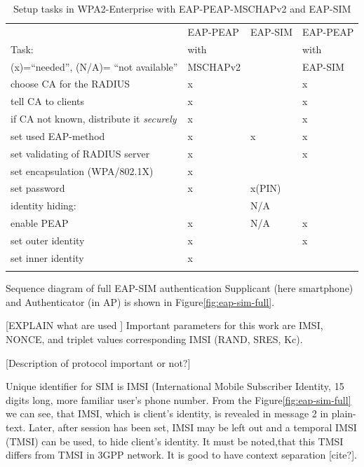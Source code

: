 \documentclass[12pt,a4paper,english]{tutthesis}
\begin{document}
\begin{otherlanguage}{english}
\begin{table}[htb]
\caption{\label{table-peapsim}Setup tasks in  WPA2-Enterprise with EAP-PEAP-MSCHAPv2 and EAP-SIM}
\centering
\begin{tabular}{llll}
 & EAP-PEAP & EAP-SIM & EAP-PEAP\\
Task: & with &  & with\\
(x)=``needed'', (N/A)= ``not available'' & MSCHAPv2 &  & EAP-SIM\\
\hline
choose CA for the RADIUS & x &  & x\\
tell CA to clients & x &  & x\\
if CA not known, distribute it \emph{securely} & x &  & x\\
set used EAP-method & x & x & x\\
set validating of RADIUS server & x &  & x\\
set encapsulation (WPA/802.1X) & x &  & \\
set password & x & x(PIN) & \\
identity hiding: &  & N/A & \\
enable PEAP & x & N/A & x\\
set outer identity & x &  & x\\
set inner identity & x &  & \\
 &  &  & \\
\hline
\end{tabular}
\end{table}





Sequence diagram of full EAP-SIM authentication Supplicant (here
smartphone) and Authenticator (in AP) is shown in
Figure\ref{fig:eap-sim-full}. 

[EXPLAIN what are used ]
Important parameters for this work are IMSI, NONCE, and triplet values
corresponding IMSI (RAND, SRES, Kc).

[Description of protocol important or not?]

Unique identifier for SIM is IMSI (International Mobile Subscriber
Identity, 15 digits long, more familiar user's phone number.
From the Figure\ref{fig:eap-sim-full} we can see, that IMSI, which is client's identity, is
revealed in message 2 in plain-text. Later, after session has been
set, IMSI may be left out and a temporal IMSI (TMSI) can be used,
to hide client's identity. It must be noted,that this TMSI differs from
TMSI in 3GPP network. It is good to have context separation [cite?].




\end{otherlanguage}
\end{document}
